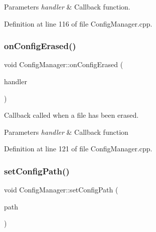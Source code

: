 \begin{DoxyParams}{Parameters}
{\em handler} & Callback function. \\
\hline
\end{DoxyParams}


Definition at line 116 of file Config\+Manager.\+cpp.

\mbox{\label{classcfg_1_1_config_manager_abee2ba9f508be9604bf91d7f90691bcf}} 
\subsubsection{\texorpdfstring{on\+Config\+Erased()}{onConfigErased()}}
{\footnotesize\ttfamily void Config\+Manager\+::on\+Config\+Erased (\begin{DoxyParamCaption}\item[{\hyperlink{classcfg_1_1_config_manager_a6614f22d32db38ce6d6ed5b351d4f628}{Callback\+Handler} \&\&}]{handler }\end{DoxyParamCaption})}



Callback called when a file has been erased. 


\begin{DoxyParams}{Parameters}
{\em handler} & Callback function \\
\hline
\end{DoxyParams}


Definition at line 121 of file Config\+Manager.\+cpp.

\mbox{\label{classcfg_1_1_config_manager_adf39406f57dfd1871ee974dd86d16abc}} 
\subsubsection{\texorpdfstring{set\+Config\+Path()}{setConfigPath()}}
{\footnotesize\ttfamily void Config\+Manager\+::set\+Config\+Path (\begin{DoxyParamCaption}\item[{const std\+::string \&}]{path }\end{DoxyParamCaption})}



